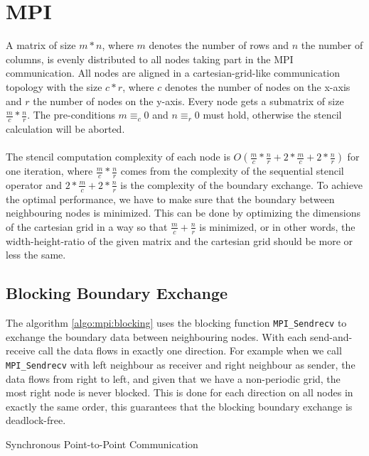 \documentclass[11pt,a4paper]{article}
\begin{document}
\section{MPI}
A matrix of size $m * n$, where $m$ denotes the number of rows and $n$ the number of columns, is evenly distributed to all nodes taking part in the MPI communication. All nodes are aligned in a cartesian-grid-like communication topology with the size $c * r$, where $c$ denotes the number of nodes on the x-axis and $r$ the number of nodes on the y-axis. Every node gets a submatrix of size $\tfrac{m}{c} * \tfrac{n}{r}$. The pre-conditions $m \equiv_c 0$ and $n \equiv_r 0$ must hold, otherwise the stencil calculation will be aborted.\\
\\
The stencil computation complexity of each node is $O(\tfrac{m}{c} * \tfrac{n}{r} + 2 * \tfrac{m}{c} + 2 * \tfrac{n}{r})$ for one iteration, where $\tfrac{m}{c} * \tfrac{n}{r}$ comes from the complexity of the sequential stencil operator and $2 * \tfrac{m}{c} + 2 * \tfrac{n}{r}$ is the complexity of the boundary exchange. To achieve the optimal performance, we have to make sure that the boundary between neighbouring nodes is minimized. This can be done by optimizing the dimensions of the cartesian grid in a way so that $\tfrac{m}{c} + \tfrac{n}{r}$ is minimized, or in other words, the width-height-ratio of the given matrix and the cartesian grid should be more or less the same.

\subsection{Blocking Boundary Exchange}
The algorithm \ref{algo:mpi:blocking} uses the blocking function \verb|MPI_Sendrecv| to exchange the boundary data between neighbouring nodes. With each send-and-receive call the data flows in exactly one direction. For example when we call \verb|MPI_Sendrecv| with left neighbour as receiver and right neighbour as sender, the data flows from right to left, and given that we have a non-periodic grid, the most right node is never blocked. This is done for each direction on all nodes in exactly the same order, this guarantees that the blocking boundary exchange is deadlock-free.\\

\begin{algorithm}[H] \label{algo:mpi:blocking}
 \caption{Synchronous Point-to-Point Communication}
\end{algorithm}
\end{document}
